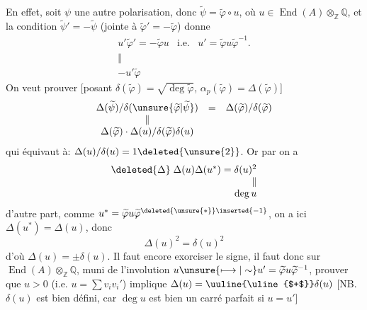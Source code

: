 En effet, soit $\psi$ une autre polarisation, donc $\widetilde\psi=\widetilde\varphi\circ u$, où $u\in\operatorname{End}(A)\otimes_{\mathbb Z}\mathbb Q$,  et la condition $\widetilde\psi'=-\widetilde\psi$ (jointe à $\widetilde\varphi'=-\widetilde\varphi$) donne
\[
\begin{array}{ccc}
u'\widetilde\varphi'=-\widetilde\varphi u & \text{i.e.} & u'=\widetilde\varphi u\widetilde\varphi^{-1}.\\
\Vert &&\\
-u'\widetilde\varphi &&
\end{array}
\]
On veut prouver [posant $\delta(\widetilde\varphi)=\sqrt{\deg\widetilde\varphi}$, $\alpha_p(\widetilde\varphi)=\Delta(\widetilde\varphi)$]
\[
\begin{array}{ccc}
\Delta(\widetilde\psi)/\delta(\unsure{\widetilde\varphi|\widetilde\psi})&=&\Delta(\widetilde\varphi)/\delta(\widetilde\varphi)\\
\Vert&&\\
\Delta(\widetilde\varphi)\cdot\Delta(u)/\delta(\widetilde\varphi)\delta(u)&&
\end{array}
\]
qui équivaut à: $\Delta(u)/\delta(u)=1\deleted{\unsure{2}}$. Or par  on a
\[
\begin{array}{c}
\deleted{\Delta}\;\Delta(u)\Delta(u^*)=\delta(u)^2\\
\hfill\Vert\\
\hfill\deg u
\end{array}
\]
d'autre part, comme $u^*=\widetilde\varphi u\widetilde\varphi^{\deleted{\unsure{*}}\inserted{-1}}$, on a ici $\Delta(u^*)=\Delta(u)$, donc 
\[
\Delta(u)^2=\delta(u)^2
\]
d'où $\Delta(u)=\pm\delta(u)$. Il faut encore exorciser le signe, il faut  donc sur $\operatorname{End}(A)\otimes_{\mathbb Z}\mathbb Q$, muni de l'involution $u\unsure{\longmapsto|\sim}u'=\widetilde\varphi u\widetilde\varphi^{-1}$, prouver que $u>0$ (i.e.  $u=\sum v_iv_i'$)  implique $\Delta(u)={\text{\uuline{\uline{$+$}}}}\delta(u)$ [NB. $\delta(u)$ est bien défini, car $\deg u$ est bien un carré parfait si $u=u'$]
